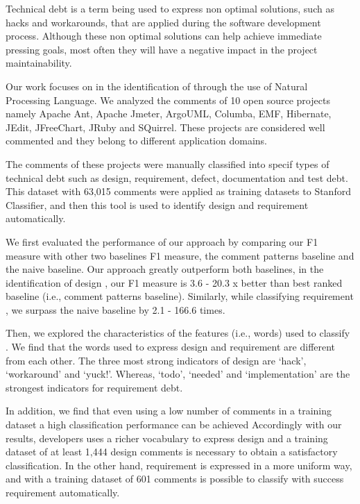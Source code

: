Technical debt is a term being used to express non optimal solutions, such as hacks and workarounds, that are applied during the software development process. Although these non optimal solutions can help achieve immediate pressing goals, most often they will have a negative impact in the project maintainability. 

Our work focuses on in the identification of \SATD through the use of Natural Processing Language. We analyzed the comments of 10 open source projects namely Apache Ant, Apache Jmeter, ArgoUML, Columba, EMF, Hibernate, JEdit, JFreeChart, JRuby and SQuirrel. These projects are considered well commented and they belong to different application domains.

The comments of these projects were manually classified into specif types of technical debt such as design, requirement, defect, documentation and test debt. This dataset with 63,015 comments were applied as training datasets to Stanford Classifier, and then this tool is used to identify  design and requirement \SATD automatically.

We first evaluated the performance of our approach by comparing our F1 measure with other two baselines F1 measure, the comment patterns baseline and the naive baseline. Our approach greatly outperform both baselines, in the identification of design \SATD, our F1 measure is 3.6 - 20.3 x better than best ranked baseline (i.e., comment patterns baseline). Similarly, while classifying requirement \SATD, we surpass the naive baseline by 2.1 - 166.6 times.

Then, we explored the characteristics of the features (i.e., words) used to classify \SATD. We find that the words used to express design and requirement \SATD are different from each other. The three most strong indicators of design \SATD are `hack', `workaround' and `yuck!'. Whereas, `todo', `needed' and `implementation' are the strongest indicators for requirement debt.
 
In addition, we find that even using a low number of \SATD comments in a training dataset a high classification performance can be achieved Accordingly with our results, developers uses a richer vocabulary to express design \SATD and a training dataset of at least 1,444 design \SATD comments is necessary to obtain a satisfactory classification. In the other hand, requirement \SATD is expressed in a more uniform way, and with a training dataset of 601 \SATD comments is possible to classify with success requirement \SATD automatically.

